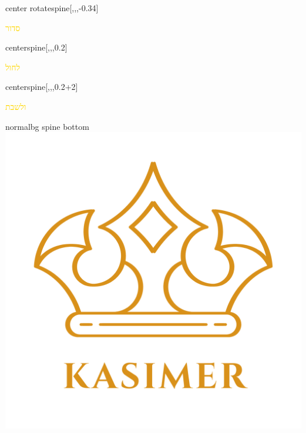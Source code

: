 \documentclass[
coverheight=8.5in,%
coverwidth=5.5in,%
spinewidth=.75in,
bleedwidth=.75in,
marklength=0in,
12pt,
pagecolor=black,
]{bookcover}
\newcommand{\hebtext}[1]{
\begin{hebrew}
	#1
\end{hebrew}
}
\begin{document}
	\begin{bookcover}
	\begin{bookcoverelement}{center rotate}{spine}[,,,-0.34\coverheight]
		\LARGE\textcolor{gold}{\hebtext{סדור} }
	\end{bookcoverelement}
	\begin{bookcoverelement}{center}{spine}[,,,0.2\coverheight]
	\textcolor{gold}{\hebtext{לחול}}
	\end{bookcoverelement}
	\begin{bookcoverelement}{center}{spine}[,,,0.2\coverheight+2\baselineskip]
	\textcolor{gold}{\hebtext{ולשבת}}
	\end{bookcoverelement}
	\begin{bookcoverelement}{normal}{bg spine bottom}
		\includegraphics[width=0.8\spinewidth,height=0.8\spinewidth]{kasimer_logo.png}
	\end{bookcoverelement}
		


\end{bookcover}
\end{document}
